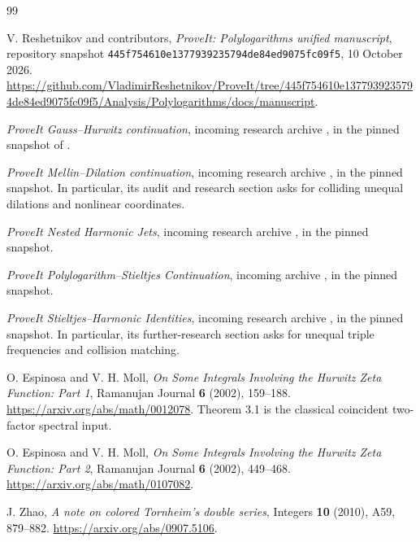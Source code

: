 \documentclass[11pt,a4paper]{article}
\numberwithin{equation}{section}
\theoremstyle{definition}
\theoremstyle{remark}
\begin{document}
\begin{thebibliography}{99}
\small
\raggedright
\setlength{\itemsep}{3pt}
\setlength{\parskip}{0pt}

V. Reshetnikov and contributors,
\emph{ProveIt: Polylogarithms unified manuscript},
repository snapshot \texttt{445f754610e1377939235794de84ed9075fc09f5},
10 October 2026.
\url{https://github.com/VladimirReshetnikov/ProveIt/tree/445f754610e1377939235794de84ed9075fc09f5/Analysis/Polylogarithms/docs/manuscript}.

\emph{ProveIt Gauss--Hurwitz continuation}, incoming research archive
, in the pinned
 snapshot of \cite{ProveIt}.

\emph{ProveIt Mellin--Dilation continuation}, incoming research archive
, in the pinned snapshot.
In particular, its audit and research section asks for colliding
unequal dilations and nonlinear coordinates.

\emph{ProveIt Nested Harmonic Jets}, incoming research archive
, in the pinned snapshot.

\emph{ProveIt Polylogarithm--Stieltjes Continuation}, incoming archive
,
in the pinned snapshot.

\emph{ProveIt Stieltjes--Harmonic Identities}, incoming research archive
,
in the pinned snapshot. In particular, its further-research section
asks for unequal triple frequencies and collision matching.

O. Espinosa and V. H. Moll,
\emph{On Some Integrals Involving the Hurwitz Zeta Function: Part 1},
Ramanujan Journal \textbf{6} (2002), 159--188.
\url{https://arxiv.org/abs/math/0012078}.
Theorem 3.1 is the classical coincident two-factor spectral input.

O. Espinosa and V. H. Moll,
\emph{On Some Integrals Involving the Hurwitz Zeta Function: Part 2},
Ramanujan Journal \textbf{6} (2002), 449--468.
\url{https://arxiv.org/abs/math/0107082}.

J. Zhao, \emph{A note on colored Tornheim's double series},
Integers \textbf{10} (2010), A59, 879--882.
\url{https://arxiv.org/abs/0907.5106}.


\end{thebibliography}
\end{document}
